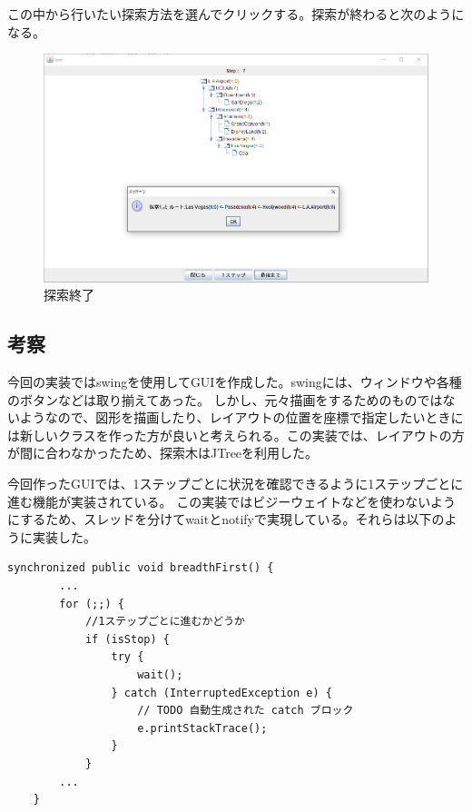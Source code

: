 ﻿\documentclass{jarticle}
\begin{document}
この中から行いたい探索方法を選んでクリックする。探索が終わると次のようになる。


\begin{figure}[!hbt]
  \centering
  \includegraphics[bb=0 0 1003 595,width=1\linewidth]{gui2.png}
  \caption{探索終了}
  \label{fig:gui2}
\end{figure}
\subsection{考察}
今回の実装ではswingを使用してGUIを作成した。swingには、ウィンドウや各種のボタンなどは取り揃えてあった。
しかし、元々描画をするためのものではないようなので、図形を描画したり、レイアウトの位置を座標で指定したいときには新しいクラスを作った方が良いと考えられる。この実装では、レイアウトの方が間に合わなかったため、探索木はJTreeを利用した。

今回作ったGUIでは、1ステップごとに状況を確認できるように1ステップごとに進む機能が実装されている。
この実装ではビジーウェイトなどを使わないようにするため、スレッドを分けてwaitとnotifyで実現している。それらは以下のように実装した。
\begin{lstlisting}[caption=wait部分,label=src:wait]
synchronized public void breadthFirst() {
        ...
        for (;;) {
            //1ステップごとに進むかどうか
            if (isStop) {
                try {
                    wait();
                } catch (InterruptedException e) {
                    // TODO 自動生成された catch ブロック
                    e.printStackTrace();
                }
            }
        ...
    }
\end{lstlisting}
\end{document}

